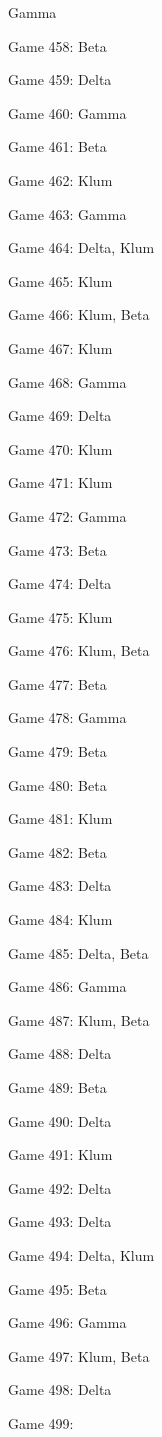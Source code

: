\documentclass{article}
\begin{document}
\begin{multicols}{3}
\begin{compactitem}
Gamma
\item Game 458:
Beta
\item Game 459:
Delta
\item Game 460:
Gamma
\item Game 461:
Beta
\item Game 462:
Klum
\item Game 463:
Gamma
\item Game 464:
Delta, Klum
\item Game 465:
Klum
\item Game 466:
Klum, Beta
\item Game 467:
Klum
\item Game 468:
Gamma
\item Game 469:
Delta
\item Game 470:
Klum
\item Game 471:
Klum
\item Game 472:
Gamma
\item Game 473:
Beta
\item Game 474:
Delta
\item Game 475:
Klum
\item Game 476:
Klum, Beta
\item Game 477:
Beta
\item Game 478:
Gamma
\item Game 479:
Beta
\item Game 480:
Beta
\item Game 481:
Klum
\item Game 482:
Beta
\item Game 483:
Delta
\item Game 484:
Klum
\item Game 485:
Delta, Beta
\item Game 486:
Gamma
\item Game 487:
Klum, Beta
\item Game 488:
Delta
\item Game 489:
Beta
\item Game 490:
Delta
\item Game 491:
Klum
\item Game 492:
Delta
\item Game 493:
Delta
\item Game 494:
Delta, Klum
\item Game 495:
Beta
\item Game 496:
Gamma
\item Game 497:
Klum, Beta
\item Game 498:
Delta
\item Game 499:

\end{compactitem}
\end{multicols}
\end{document}
